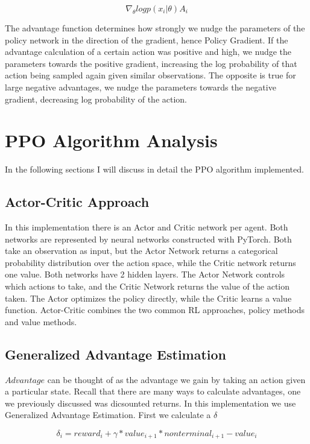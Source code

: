 \documentclass[conference]{IEEEtran}
\begin{document}
\begin{equation}
    \nabla_\theta log p(x_i \vert \theta) A_i
\end{equation}

The advantage function determines how strongly we nudge the parameters of the policy network in the direction of the gradient, hence Policy Gradient. 
If the advantage calculation of a certain action was positive and high, we nudge the parameters towards the positive gradient, increasing the log probability 
of that action being sampled again given similar observations. The opposite is true for large negative advantages, we nudge the parameters towards the 
negative gradient, decreasing log probability of the action. \par

\section{PPO Algorithm Analysis}
In the following sections I will discuss in detail the PPO algorithm implemented.

\subsection{Actor-Critic Approach}
In this implementation there is an Actor and Critic network per agent. Both networks are represented by neural networks constructed with PyTorch. 
Both take an observation as input, but the Actor Network returns a categorical probability distribution over the action space, while the Critic network
returns one value. Both networks have 2 hidden layers. 
The Actor Network controls which actions to take, and the Critic Network returns the value of the action taken. The Actor optimizes the
policy directly, while the Critic learns a value function. Actor-Critic combines the two common RL approaches, policy methods and value methods. 

\subsection{Generalized Advantage Estimation}
$\textit{Advantage}$ can be thought of as the advantage we gain by taking an action given a particular state. Recall that there are many ways
to calculate advantages, one we previously discussed was dicsounted returns. In this implementation we use Generalized Advantage Estimation. 
First we calculate a $\delta$

\begin{equation}
    \delta_i = reward_i + \gamma * value_{i+1} * nonterminal_{i+1} - value_i
\end{equation}
\end{document}

